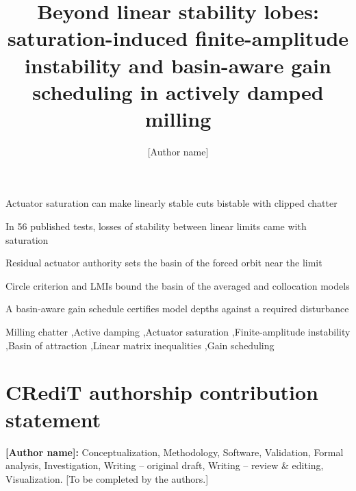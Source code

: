 \documentclass[preprint,12pt]{elsarticle}
\begin{document}
\begin{frontmatter}

\title{Beyond linear stability lobes: saturation-induced finite-amplitude instability and basin-aware gain scheduling in actively damped milling}

\author[a]{[Author name]}

\begin{abstract}

\end{abstract}

\begin{highlights}
\item Actuator saturation can make linearly stable cuts bistable with clipped chatter
\item In 56 published tests, losses of stability between linear limits came with saturation
\item Residual actuator authority sets the basin of the forced orbit near the limit
\item Circle criterion and LMIs bound the basin of the averaged and collocation models
\item A basin-aware gain schedule certifies model depths against a required disturbance
\end{highlights}

\begin{keyword}
Milling chatter \sep Active damping \sep Actuator saturation \sep Finite-amplitude instability \sep Basin of attraction \sep Linear matrix inequalities \sep Gain scheduling
\end{keyword}

\end{frontmatter}

\linenumbers










\section*{CRediT authorship contribution statement}
\textbf{[Author name]:} Conceptualization, Methodology, Software, Validation, Formal analysis, Investigation, Writing -- original draft, Writing -- review \& editing, Visualization. [To be completed by the authors.]
\end{document}
